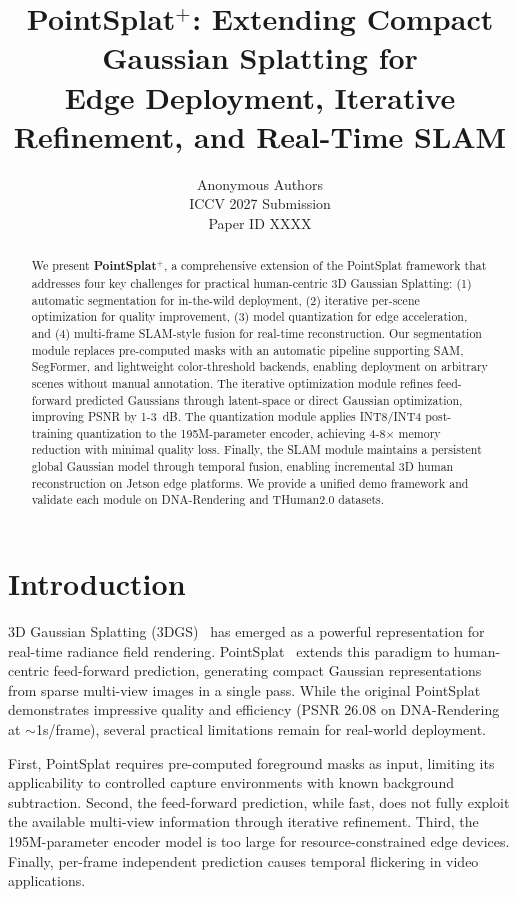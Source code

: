 \documentclass[10pt,twocolumn,letterpaper]{article}
\title{PointSplat$^+$: Extending Compact Gaussian Splatting for\\
Edge Deployment, Iterative Refinement, and Real-Time SLAM}
\author{Anonymous Authors\\
ICCV 2027 Submission\\
Paper ID XXXX}
\newcommand{\ours}{\textbf{PointSplat$^+$}}
\begin{document}
\maketitle

\begin{abstract}
We present \ours{}, a comprehensive extension of the PointSplat framework
that addresses four key challenges for practical human-centric 3D Gaussian
Splatting: (1) automatic segmentation for in-the-wild deployment,
(2) iterative per-scene optimization for quality improvement,
(3) model quantization for edge acceleration, and
(4) multi-frame SLAM-style fusion for real-time reconstruction.
Our segmentation module replaces pre-computed masks with an automatic
pipeline supporting SAM, SegFormer, and lightweight color-threshold backends,
enabling deployment on arbitrary scenes without manual annotation.
The iterative optimization module refines feed-forward predicted Gaussians
through latent-space or direct Gaussian optimization, improving PSNR by 1-3~dB.
The quantization module applies INT8/INT4 post-training quantization to the
195M-parameter encoder, achieving 4-8$\times$ memory reduction with minimal
quality loss. Finally, the SLAM module maintains a persistent global Gaussian
model through temporal fusion, enabling incremental 3D human reconstruction
on Jetson edge platforms. We provide a unified demo framework and validate
each module on DNA-Rendering and THuman2.0 datasets.
\end{abstract}

\section{Introduction}
\label{sec:intro}

3D Gaussian Splatting (3DGS)~\cite{kerbl3Dgaussians} has emerged as a
powerful representation for real-time radiance field rendering. PointSplat~\cite{guo2026pointsplat}
extends this paradigm to human-centric feed-forward prediction, generating
compact Gaussian representations from sparse multi-view images in a single
pass. While the original PointSplat demonstrates impressive quality and
efficiency (PSNR 26.08 on DNA-Rendering at $\sim$1s/frame), several
practical limitations remain for real-world deployment.

First, PointSplat requires pre-computed foreground masks as input,
limiting its applicability to controlled capture environments with
known background subtraction. Second, the feed-forward prediction, while
fast, does not fully exploit the available multi-view information through
iterative refinement. Third, the 195M-parameter encoder model is too
large for resource-constrained edge devices. Finally, per-frame
independent prediction causes temporal flickering in video applications.
\end{document}
